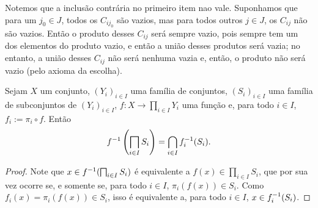 Notemos que a inclusão contrária no primeiro item nao vale. Suponhamos que para um $j_0 \in J$, todos os $C_{ij_0}$ são vazios, mas para todos outros $j \in J$, os $C_{ij}$ não são vazios. Então o produto desses $C_{ij}$ será sempre vazio, pois sempre tem um dos elementos do produto vazio, e então a união desses produtos será vazia; no entanto, a união desses $C_{ij}$ não será nenhuma vazia e, então, o produto não será vazio (pelo axioma da escolha).

\begin{proposition}
\label{conj:proposition.im.inv.prod}
Sejam $X$ um conjunto, $(Y_i)_{i \in I}$ uma família de conjuntos, $(S_i)_{i \in I}$ uma família de subconjuntos de $(Y_i)_{i \in I}$, $f: X \to \prod_{i \in I} Y_i$ uma função e, para todo $i \in I$, $f_i := \pi_i \circ f$. Então
	\begin{equation*}
	f\inv\left( \prod_{i \in I} {S_i} \right) = \bigcap_{i \in I} f_i\inv (S_i).
	\end{equation*}
\end{proposition}
\begin{proof}
Note que $x \in f\inv(\prod_{i \in I} {S_i})$ é equivalente a $f(x) \in \prod_{i \in I} {S_i}$, que por sua vez ocorre se, e somente se, para todo $i \in I$, $\pi_i(f(x)) \in S_i$. Como $f_i(x)=\pi_i(f(x)) \in S_i$, isso é equivalente a, para todo $i \in I$, $x \in f_i^{-1} (S_i)$.
\end{proof}










